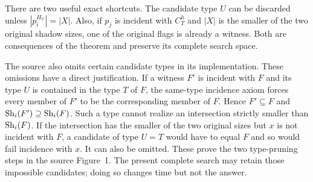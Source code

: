 There are two useful exact shortcuts. The candidate type $U$ can be
discarded unless $|p_i^{H_U}|=|X|$. Also, if $p_j$ is incident with
$C_T^h$ and $|X|$ is the smaller of the two original shadow sizes, one
of the original flags is already a witness. Both are consequences of
the theorem and preserve its complete search space.

The source also omits certain candidate types in its implementation.
These omissions have a direct justification. If a witness $F'$ is
incident with $F$ and its type $U$ is contained in the type $T$ of $F$,
the same-type incidence axiom forces every member of $F'$ to be the
corresponding member of $F$. Hence $F'\subseteq F$ and
$\operatorname{Sh}_i(F')\supseteq\operatorname{Sh}_i(F)$. Such a type cannot realize an intersection
strictly smaller than $\operatorname{Sh}_i(F)$. If the intersection has the smaller
of the two original sizes but $x$ is not incident with $F$, a candidate
of type $U=T$ would have to equal $F$ and so would fail incidence with
$x$. It can also be omitted. These prove the two type-pruning steps in
the source Figure~1. The present complete search may retain those
impossible candidates; doing so changes time but not the answer.


